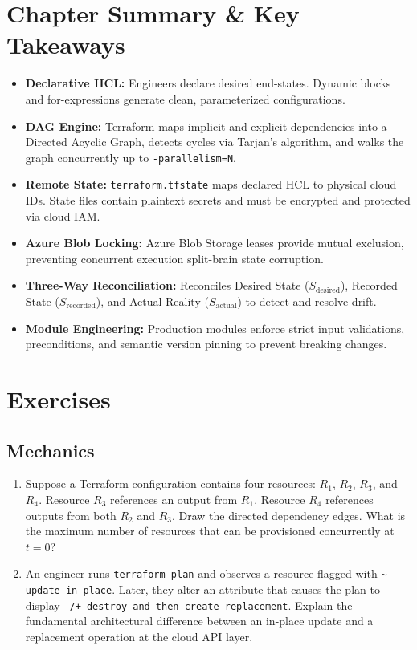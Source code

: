 \section{Chapter Summary \& Key Takeaways}
\begin{itemize}[leftmargin=15pt]
  \item \textbf{Declarative HCL:} Engineers declare desired end-states. Dynamic blocks and for-expressions generate clean, parameterized configurations.
  \item \textbf{DAG Engine:} Terraform maps implicit and explicit dependencies into a Directed Acyclic Graph, detects cycles via Tarjan's algorithm, and walks the graph concurrently up to \texttt{-parallelism=N}.
  \item \textbf{Remote State:} \texttt{terraform.tfstate} maps declared HCL to physical cloud IDs. State files contain plaintext secrets and must be encrypted and protected via cloud IAM.
  \item \textbf{Azure Blob Locking:} Azure Blob Storage leases provide mutual exclusion, preventing concurrent execution split-brain state corruption.
  \item \textbf{Three-Way Reconciliation:} Reconciles Desired State ($S_{\text{desired}}$), Recorded State ($S_{\text{recorded}}$), and Actual Reality ($S_{\text{actual}}$) to detect and resolve drift.
  \item \textbf{Module Engineering:} Production modules enforce strict input validations, preconditions, and semantic version pinning to prevent breaking changes.
\end{itemize}

\section{Exercises}

\subsection{Mechanics}
\begin{enumerate}[leftmargin=18pt]
  \item Suppose a Terraform configuration contains four resources: $R_1$, $R_2$, $R_3$, and $R_4$. Resource $R_3$ references an output from $R_1$. Resource $R_4$ references outputs from both $R_2$ and $R_3$. Draw the directed dependency edges. What is the maximum number of resources that can be provisioned concurrently at $t=0$?
  \item An engineer runs \texttt{terraform plan} and observes a resource flagged with \texttt{\textasciitilde{} update in-place}. Later, they alter an attribute that causes the plan to display \texttt{-/+ destroy and then create replacement}. Explain the fundamental architectural difference between an in-place update and a replacement operation at the cloud API layer.
\end{enumerate}

